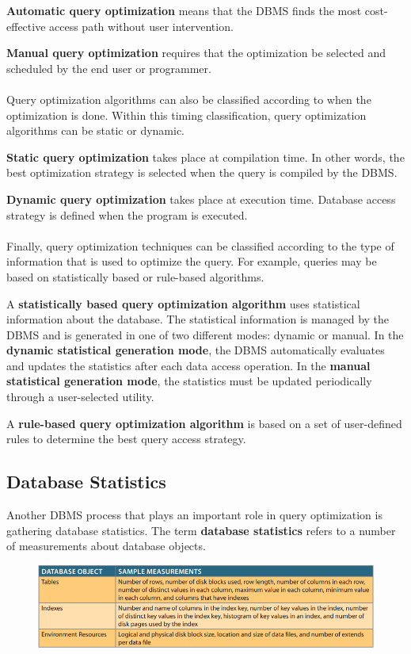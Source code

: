 \documentclass[a4paper, 11pt, titlepage]{report}
\begin{document}
\textbf{Automatic query optimization} means that the DBMS finds the most cost-effective access path without user intervention.

\textbf{Manual query optimization} requires that the optimization be selected and scheduled by the end user or programmer.\\\\
Query optimization algorithms can also be classified according to when the optimization is done. Within this timing classification, query optimization algorithms can be static or dynamic.

\textbf{Static query optimization} takes place at compilation time. In other words, the best optimization strategy is selected when the query is compiled by the DBMS.

\textbf{Dynamic query optimization} takes place at execution time. Database access strategy is defined when the program is executed.\\\\
Finally, query optimization techniques can be classified according to the type of information that is used to optimize the query. For example, queries may be based on statistically based or rule-based algorithms.

A \textbf{statistically based query optimization algorithm} uses statistical information about the database. The statistical information is managed by the DBMS and is generated in one of two different modes: dynamic or manual. In the \textbf{dynamic statistical generation mode}, the DBMS automatically evaluates and updates the statistics after each data access operation. In the \textbf{manual statistical generation mode}, the statistics must be updated periodically through a user-selected utility.

A \textbf{rule-based query optimization algorithm} is based on a set of user-defined rules to determine the best query access strategy.
\subsection{Database Statistics}
Another DBMS process that plays an important role in query optimization is gathering database statistics. The term \textbf{database statistics} refers to a number of measurements about database objects.
\begin{figure}[H]
\centering
\includegraphics[scale=0.5]{pics/stat}
\end{figure}
\end{document}
